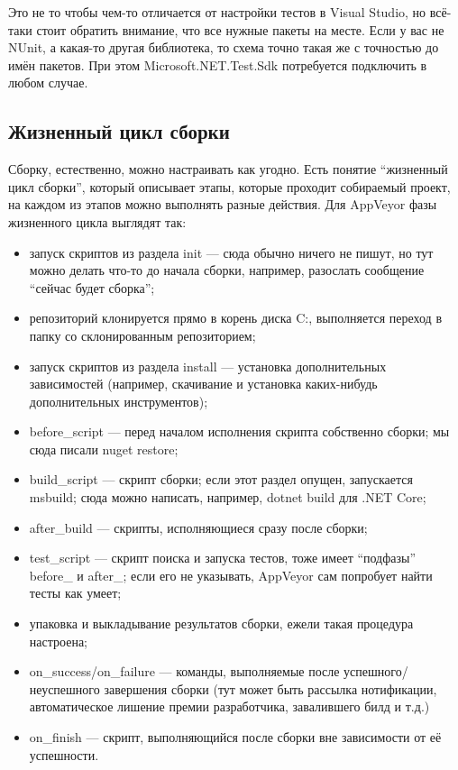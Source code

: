 \documentclass[a5paper]{article}
\begin{document}
Это не то чтобы чем-то отличается от настройки тестов в Visual Studio, но всё-таки стоит обратить внимание, что все нужные пакеты на месте. Если у вас не NUnit, а какая-то другая библиотека, то схема точно такая же с точностью до имён пакетов. При этом Microsoft.NET.Test.Sdk потребуется подключить в любом случае.

\subsection{Жизненный цикл сборки}

Сборку, естественно, можно настраивать как угодно. Есть понятие ``жизненный цикл сборки'', который описывает этапы, которые проходит собираемый проект, на каждом из этапов можно выполнять разные действия. Для AppVeyor фазы жизненного цикла выглядят так:

\begin{itemize}
	\item запуск скриптов из раздела init --- сюда обычно ничего не пишут, но тут можно делать что-то до начала сборки, например, разослать сообщение ``сейчас будет сборка'';
	\item репозиторий клонируется прямо в корень диска C:, выполняется переход в папку со склонированным репозиторием;
	\item запуск скриптов из раздела install --- установка дополнительных зависимостей (например, скачивание и установка каких-нибудь дополнительных инструментов);
	\item before\_script --- перед началом исполнения скрипта собственно сборки; мы сюда писали nuget restore;
	\item build\_script --- скрипт сборки; если этот раздел опущен, запускается msbuild; сюда можно написать, например, dotnet build для .NET Core;
	\item after\_build --- скрипты, исполняющиеся сразу после сборки;
	\item test\_script --- скрипт поиска и запуска тестов, тоже имеет ``подфазы'' before\_ и after\_; если его не указывать, AppVeyor сам попробует найти тесты как умеет;
	\item упаковка и выкладывание результатов сборки, ежели такая процедура настроена;
	\item on\_success/on\_failure --- команды, выполняемые после успешного/неуспешного завершения сборки (тут может быть рассылка нотификации, автоматическое лишение премии разработчика, завалившего билд и т.д.)
	\item on\_finish --- скрипт, выполняющийся после сборки вне зависимости от её успешности.
\end{itemize}
\end{document}
